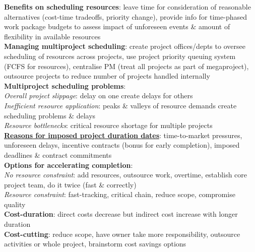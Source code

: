 \documentclass[a4paper]{article}
\begin{document}
\begin{multicols}{3}
        \textbf{Benefits on scheduling resources}: leave time for consideration of reasonable alternatives (cost-time tradeoffs, priority change), provide info for time-phased work package budgets to assess impact of unforeseen events \& amount of flexibility in available resources\\
        \textbf{Managing multiproject scheduling}: create project offices/depts to oversee scheduling of resources across projects, use project priority queuing system (FCFS for resources), centralise PM (treat all projects as part of megaproject), outsource projects to reduce number of projects handled internally\\
        \textbf{Multiproject scheduling problems}:\\
        \textit{Overall project slippage}: delay on one create delays for others\\
        \textit{Inefficient resource application}: peaks \& valleys of resource demands create scheduling problems \& delays\\
        \textit{Resource bottlenecks}: critical resource shortage for multiple projects\\
        \underline{\textbf{Reasons for imposed project duration dates}}: time-to-market pressures, unforeseen delays, incentive contracts (bonus for early completion), imposed deadlines \& contract commitments\\
        \textbf{Options for accelerating completion}:\\
        \textit{No resource constraint}: add resources, outsource work, overtime, establish core project team, do it twice (fast \& correctly)\\
        \textit{Resource constraint}: fast-tracking, critical chain, reduce scope, compromise quality\\
        \textbf{Cost-duration}: direct costs decrease but indirect cost increase with longer duration\\
        \textbf{Cost-cutting}: reduce scope, have owner take more responsibility, outsource activities or whole project, brainstorm cost savings options\\
    \end{multicols}
    
\end{document}

